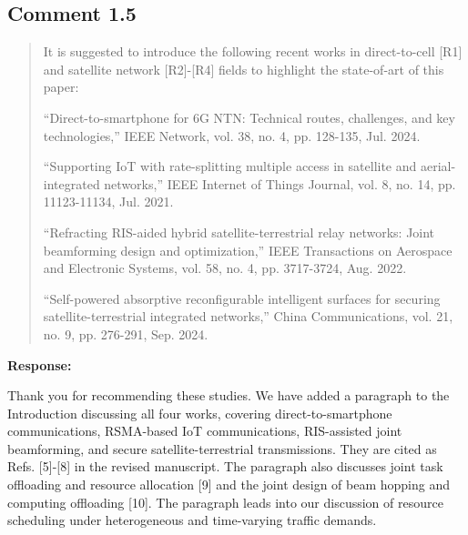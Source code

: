 \documentclass[11pt,a4paper]{article}
\begin{document}

\subsection*{Comment 1.5}

\begin{quote}\small It is suggested to introduce the following recent works in direct-to-cell [R1] and satellite network [R2]-[R4] fields to highlight the state-of-art of this paper:
\par\medskip
[R1] “Direct-to-smartphone for 6G NTN: Technical routes, challenges, and key technologies,” IEEE Network, vol. 38, no. 4, pp. 128-135, Jul. 2024.
\par\medskip
[R2] “Supporting IoT with rate-splitting multiple access in satellite and aerial-integrated networks,” IEEE Internet of Things Journal, vol. 8, no. 14, pp. 11123-11134, Jul. 2021.
\par\medskip
[R3] “Refracting RIS-aided hybrid satellite-terrestrial relay networks: Joint beamforming design and optimization,” IEEE Transactions on Aerospace and Electronic Systems, vol. 58, no. 4, pp. 3717-3724, Aug. 2022.
\par\medskip
[R4] “Self-powered absorptive reconfigurable intelligent surfaces for securing satellite-terrestrial integrated networks,” China Communications, vol. 21, no. 9, pp. 276-291, Sep. 2024.\end{quote}

\textbf{Response:}\par

Thank you for recommending these studies. We have added a paragraph to the Introduction discussing all four works, covering direct-to-smartphone communications, RSMA-based IoT communications, RIS-assisted joint beamforming, and secure satellite-terrestrial transmissions. They are cited as Refs. [5]-[8] in the revised manuscript. The paragraph also discusses joint task offloading and resource allocation [9] and the joint design of beam hopping and computing offloading [10]. The paragraph leads into our discussion of resource scheduling under heterogeneous and time-varying traffic demands.
\par
\end{document}
